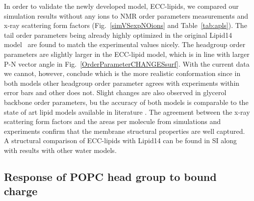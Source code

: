 \documentclass[aip,jcp,twocolumn]{revtex4}
\begin{document}
In order to validate the newly developed model, ECC-lipids, 
we compared our simulation results without any ions to
NMR order parameters measurements and x-ray scattering form factors 
(Fig.~\ref{simVSexpNOions} and Table~\ref{tab:apls}). 
The tail order parameters being already highly optimized in the original Lipid14 model~\cite{dickson14}
are found to match the experimental values nicely.
The headgroup order parameters are slightly larger in the ECC-lipid model,
which is in line with larger P-N vector angle in Fig.~\ref{OrderParameterCHANGESsurf}.
With the current data we cannot, however, conclude which is the more realistic
conformation since in both models other headgroup order parameter agrees
with experiments within error bars and other does not.
Slight changes are also observed in glycerol backbone order parameters,
bu the accuracy of both models is comparable to the state of art lipid models
available in literature \cite{ollila16}. The agreement between the x-ray scattering
form factors and the areas per molecule from simulations and experiments
confirm that the membrane structural properties are well captured. 
A structural comparison of ECC-lipids with Lipid14 can be found 
in SI along with results with other water models. 

\subsection{Response of POPC head group to bound charge}
\end{document}
